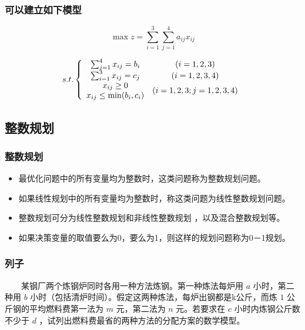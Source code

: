 \documentclass[slidestop,compress,mathserif,c]{beamer}
\makeatletter
\newcommand{\tablecell}[2]{\begin{tabular}{@{}#1@{}}#2\end{tabular}}   %
\makeatother
\begin{document}
\begin{frame}
\frametitle{可以建立如下模型}
    $$\max z=\sum_{i=1}^3\sum_{j=1}^4a_{ij}x_{ij}$$
\begin{center}
  \begin{eqnarray*}
    s.t.\left\{
    \begin{array}{cc}
      \sum_{j=1}^4x_{ij}=b_i&(i=1,2,3)\\
      \sum_{i=1}^3x_{ij}=c_j&(i=1,2,3,4)\\
      \tablecell{c}{$x_{ij}\geq0$\\$x_{ij}\leq\min(b_i,c_i)$}&(i=1,2,3;j=1,2,3,4)

    \end{array}\right.
  \end{eqnarray*}
\end{center}


\end{frame}


\subsection{\hfill 整数规划}
\begin{frame}
\frametitle{整数规划}
\begin{itemize}
\item 最优化问题中的所有变量均为整数时，这类问题称为整数规划问题。
\item 如果线性规划中的所有变量均为整数时，称这类问题为线性整数规划问题。
\item 整数规划可分为线性整数规划和非线性整数规划 ，以及混合整数规划等。
\item 如果决策变量的取值要么为0，要么为1，则这样的规划问题称为0－1规划。
\end{itemize}
\end{frame}


\begin{frame}
\frametitle{列子}
~~~~某钢厂两个炼钢炉同时各用一种方法炼钢。第一种炼法每炉用 $a$ 小时，第二种用 $b$ 小时（包括清炉时间）。假定这两种炼法，每炉出钢都是k公斤，而炼 $1$ 公斤钢的平均燃料费第一法为 $m$ 元，第二法为 $n$ 元。若要求在 $c$ 小时内炼钢公斤数不少于 $d$ ，试列出燃料费最省的两种方法的分配方案的数学模型。

\end{frame}
\end{document}
